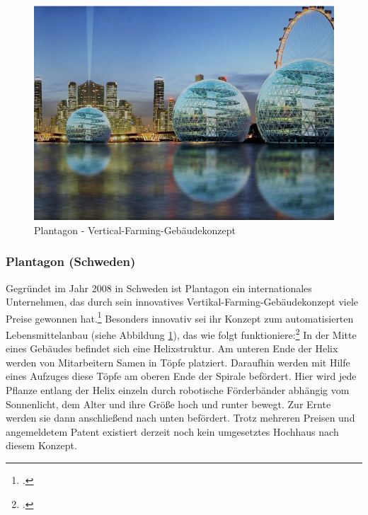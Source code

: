 \documentclass{scrartcl}
\begin{document}
\begin{figure}[htbp]
    \centering
    \includegraphics[width=14cm]{image_folder/plantagon.png}
  \caption{Plantagon - Vertical-Farming-Gebäudekonzept}
  \label{fig:plantagon}
\end{figure} 

\subsubsection*{Plantagon (Schweden)}
Gegründet im Jahr 2008 in Schweden ist Plantagon ein internationales Unternehmen, das durch sein innovatives Vertikal-Farming-Gebäudekonzept viele Preise gewonnen hat.\footcite[Vgl.]{PlantagonAwardsPlantagon} Besonders innovativ sei ihr Konzept zum automatisierten Lebensmittelanbau (siehe Abbildung \ref{fig:plantagon}), das wie folgt funktioniere:\footcite[Vgl.][S.21f]{Al-Kodmany2018TheCity}  In der Mitte eines Gebäudes befindet sich eine Helixstruktur. Am unteren Ende der Helix werden von Mitarbeitern Samen in Töpfe platziert. Daraufhin werden mit Hilfe eines Aufzuges diese Töpfe am oberen Ende der Spirale befördert. Hier wird jede Pflanze entlang der Helix einzeln durch robotische Förderbänder abhängig vom Sonnenlicht, dem Alter und ihre Größe hoch und runter bewegt. Zur Ernte werden sie dann anschließend nach unten befördert. Trotz mehreren Preisen und angemeldetem Patent existiert derzeit noch kein umgesetztes Hochhaus nach diesem Konzept.
\end{document}
